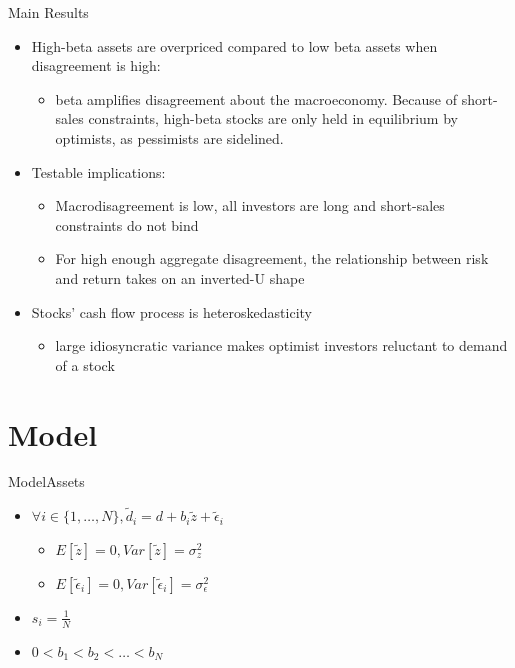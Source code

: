 \documentclass{beamer}
\begin{document}
\begin{frame}{Main Results}
\begin{itemize}
\item High-beta assets are overpriced compared to low beta assets when disagreement is high:
\begin{itemize}
\tiny
\item beta amplifies disagreement about the macroeconomy. 
Because of short-sales constraints, high-beta stocks are only held in equilibrium by optimists, as pessimists are sidelined.
\end{itemize}
\item Testable implications:
\begin{itemize}
\tiny
\item Macrodisagreement is low, all investors are long and short-sales constraints do not bind
\item  For high enough aggregate disagreement, the
relationship between risk and return takes on an inverted-U shape
\end{itemize}
\item Stocks’ cash flow process is heteroskedasticity
\begin{itemize}
\tiny
\item 	large idiosyncratic variance makes optimist investors reluctant to demand of a stock
\end{itemize}
\end{itemize}
\end{frame}

\section{Model}

\begin{frame}{Model}{Assets}
\begin{itemize}
\item $ \forall i \in \{1,\dots, N\}, \tilde{d}_i = d + b_i \tilde{z} + \tilde{\epsilon}_i $ 
\begin{itemize}
\footnotesize
\item $ E[\tilde{z}] = 0 , Var[\tilde{z}] = \sigma ^2_z$
\item  $ E[\tilde{\epsilon}_i] = 0 , Var[\tilde{\epsilon}_i] = \sigma ^2_{\epsilon}$  
\end{itemize}
\item $ s_i = \frac{1}{N} $
\item $ 0<b_1 <b_2<\dots<b_N $
\end{itemize}
\end{frame}
\end{document}
